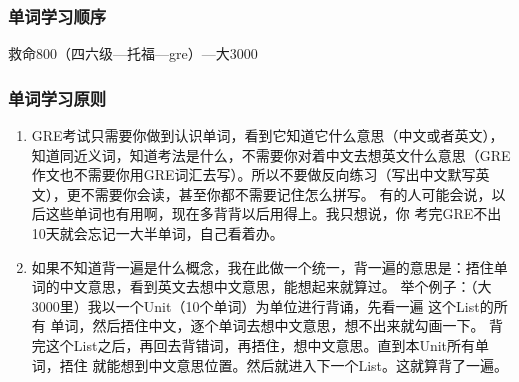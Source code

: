 \documentclass[11pt,a4paper]{article}
\begin{document}
{{{			\subsubsection*{单词学习顺序}
				救命800（四六级---托福---gre）---大3000
				
			\subsubsection*{单词学习原则}
				\begin{enumerate}
					\item GRE考试只需要你做到认识单词，看到它知道它什么意思（中文或者英文），知道同近义词，知道考法是什么，不需要你对着中文去想英文什么意思（GRE作文也不需要你用GRE词汇去写）。所以不要做反向练习（写出中文默写英文），更不需要你会读，甚至你都不需要记住怎么拼写。
					有的人可能会说，以后这些单词也有用啊，现在多背背以后用得上。我只想说，你	考完GRE不出10天就会忘记一大半单词，自己看着办。
					\item 如果不知道背一遍是什么概念，我在此做一个统一，背一遍的意思是：捂住单词的中文意思，看到英文去想中文意思，能想起来就算过。
					举个例子：（大3000里）我以一个Unit（10个单词）为单位进行背诵，先看一遍	这个List的所有	单词，然后捂住中文，逐个单词去想中文意思，想不出来就勾画一下。	背完这个List之后，再回去背错词，再捂住，想中文意思。直到本Unit所有单词，捂住	就能想到中文意思位置。然后就进入下一个List。这就算背了一遍。
				\end{enumerate}
			
}}}
\end{document}
